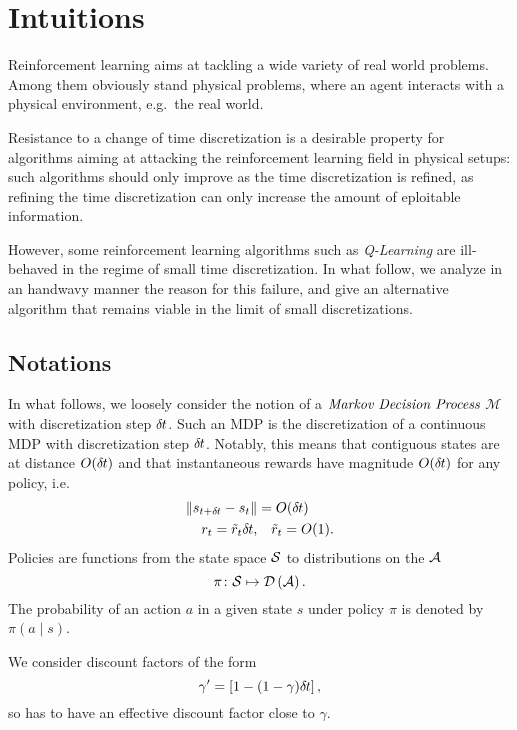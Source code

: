 
\section{Intuitions}
\label{sec:intuitions}
Reinforcement learning aims at tackling a wide variety of real world problems.
Among them obviously stand physical problems, where an agent interacts with a
physical environment, e.g.\ the real world.

Resistance to a change of time discretization is a desirable property for
algorithms aiming at attacking the reinforcement learning field in physical
setups: such algorithms should only improve as the time discretization is
refined, as refining the time discretization can only increase the amount of 
eploitable information.

However, some reinforcement learning algorithms such as \emph{Q-Learning} are
ill-behaved in the regime of small time discretization. In what follow, we
analyze in an handwavy manner the reason for this failure, and give an alternative
algorithm that remains viable in the limit of small discretizations.

\subsection{Notations}
In what follows, we loosely consider the notion of a $\emph{Markov Decision Process}$
$\mathcal{M}$ with discretization step $\delta\hspace{-.06em}t$. Such an MDP is the discretization
of a continuous MDP with discretization step $\delta\hspace{-.06em}t$. Notably, this means that
contiguous states are at distance $O (\delta\hspace{-.06em}t)$ and that instantaneous rewards
have magnitude $O (\delta\hspace{-.06em}t)$ for any policy, i.e.
\begin{align}
	\|s_{t + \delta\hspace{-.06em}t} - s_t\| &= O (\delta\hspace{-.06em}t)\\
	r_t = \tilde{r}_t \delta\hspace{-.06em}t, &\quad \tilde{r}_t = O (1).
\end{align}
Policies are functions from the state space $\mathcal{S}$ to distributions on the
$\mathcal{A}$
\begin{equation}
	\pi\colon \mathcal{S} \mapsto \mathcal{D}\left(\mathcal{A}\right).
\end{equation}
The probability of an action $a$ in a given state $s$ under policy $\pi$ is
denoted by $\pi\left(a\mid s\right)$.

We consider discount factors of the form
\begin{equation}
	\gamma' = \left[1 - (1 - \gamma) \delta\hspace{-.06em}t\right],
\end{equation}
so has to have an effective discount factor close to $\gamma$.

